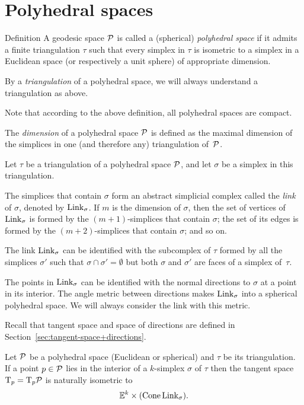 \section{Polyhedral spaces}

\begin{thm}{Definition}\label{def:poly}
A geodesic space $\mathcal{P}$ is called a (spherical) \emph{polyhedral space} 
if it admits a finite triangulation $\tau$ 
such that every simplex in $\tau$ is isometric to a simplex in a Euclidean space (or respectively a unit sphere) of appropriate dimension.

By a \emph{triangulation} of a polyhedral space, 
we will always understand a triangulation as above. 
\end{thm}

Note that according to the above definition,
all polyhedral spaces are compact.

The \emph{dimension} of a polyhedral space $\mathcal{P}$
is defined as the maximal dimension of the simplices 
in one (and therefore any) triangulation of~$\mathcal{P}$.

Let $\tau$ be a triangulation of a polyhedral space $\mathcal{P}$,
and let $\sigma$ be a simplex in this triangulation.

The simplices that contain $\sigma$
form an abstract simplicial complex called the \emph{link} of $\sigma$, 
denoted by $\mathop{\rm Link}\nolimits_\sigma$.
If $m$ is the dimension of $\sigma$,
then the set of vertices of $\mathop{\rm Link}\nolimits_\sigma$
is formed by the $(m+1)$-simplices that contain $\sigma$;
the set of its edges is formed by the $(m+2)$-simplices 
that contain $\sigma$; and so on.

The link $\mathop{\rm Link}\nolimits_\sigma$
can be identified with the subcomplex of $\tau$ 
formed by all the simplices $\sigma'$ 
such that $\sigma\cap\sigma'=\emptyset$ 
but both $\sigma$ and $\sigma'$ are faces of a simplex of~$\tau$.

The points in $\mathop{\rm Link}\nolimits_\sigma$ can be identified with the normal directions to $\sigma$ at a point in its interior.
The angle metric between directions makes $\mathop{\rm Link}\nolimits_\sigma$ into a spherical polyhedral space.
We will always consider the link with this metric.

Recall that tangent space and space of directions are defined in Section~\ref{sec:tangent-space+directions}.

Let $\mathcal{P}$ be a polyhedral space (Euclidean or spherical) and $\tau$ be its triangulation.
If a point $p\in \mathcal{P}$ 
lies in the interior of a $k$-simplex $\sigma$ of $\tau$ 
then the tangent space $\mathrm{T}_p=\mathrm{T}_p\mathcal{P}$
is naturally isometric to
\[\mathbb{E}^k\times(\mathop{\rm Cone}\nolimits\mathop{\rm Link}\nolimits_\sigma).\]

